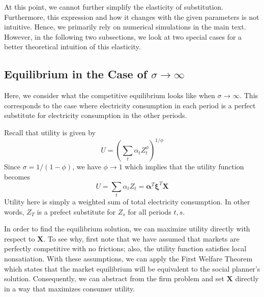 \documentclass[11pt,a4paper,leqno]{extarticle}
\begin{document}
	At this point, we cannot further simplify the elasticity of substitution. Furthermore, this expression and how it changes with the given parameters is not intuitive. Hence, we primarily rely on numerical simulations in the main text. However, in the following two subsections, we look at two special cases for a better theoretical intuition of this elasticity. 
	
	\subsection{Equilibrium in the Case of $\sigma \to \infty $}
	
	Here, we consider what the competitive equilibrium looks like when $\sigma \to \infty$. This corresponds to the case where electricity consumption in each period is a perfect substitute for electricity consumption in the other periods. 
	
	Recall that utility is given by 
	\begin{equation}
	U = \left( \sum_t \alpha_t Z_t^\phi  \right)^{1/\phi}
	\end{equation}
	Since $\sigma = 1/(1-\phi)$, we have $\phi \to 1$ which implies that the utility function becomes
	\begin{equation}
	U= \sum_t \alpha_t Z_t = \boldsymbol{\alpha}^T \boldsymbol{\xi}^T \mathbf{X}
	\end{equation}
	Utility  here is simply a weighted sum of total electricity consumption. In other words, $Z_T$ is a prefect substitute for $Z_s$ for all periods $t,s$. 
	
	In order to find the equilibrium solution, we can maximize utility directly with respect to $\mathbf{X}$. To see why, first note that we have assumed that markets are perfectly competitive with no frictions; also, the utility function satisfies local  nonsatiation. With these assumptions, we can apply the First Welfare Theorem which states that the market equilibrium will be equivalent to the social planner's solution. Consequently, we can abstract from the firm problem and set $\mathbf{X}$ directly in a way that maximizes consumer utility. 
	
\end{document}
